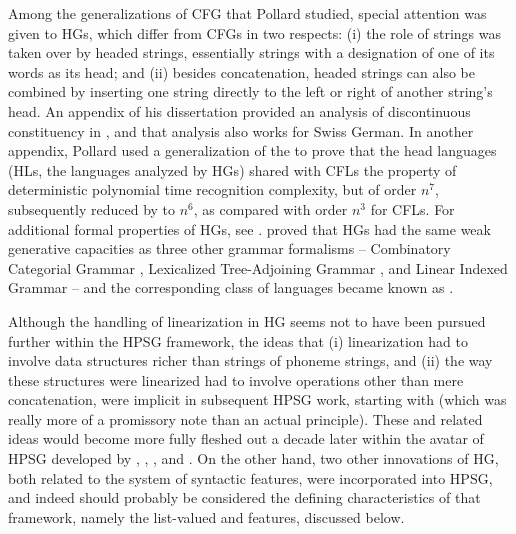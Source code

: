 \documentclass[output=paper
 	        ,biblatex
                ,babelshorthands
                ,newtxmath
                ,draftmode
                ,colorlinks, citecolor=brown
]{langscibook}
\begin{document}
Among the generalizations of CFG that Pollard studied, special attention was given to HGs, which differ from CFGs in two respects: (i) the role of strings was taken over by headed strings, essentially strings with a designation of one of its words as its head; and (ii) besides concatenation, headed strings can also be combined by inserting one string directly to the left or right of another string's head. An appendix of his dissertation \citep[Appendix~1]{Pollard84a-u} provided an analysis of discontinuous constituency in , and that analysis also works for Swiss German. In another appendix, Pollard used a generalization of the  to prove that the head languages (HLs, the languages analyzed by HGs) shared with CFLs the property of deterministic polynomial time recognition complexity, but of order $n^{7}$, subsequently reduced by \citet*{Kasamietal1989} to $n^{6}$, as compared with order $n^{3}$ for CFLs. For additional formal properties of HGs, see \citet{Roach1987}. \citet{VijayWeir1994} proved that HGs had the same weak generative capacities as three other grammar formalisms -- Combinatory Categorial Grammar \citep{Steedman87a-u,Steedman90a-u}, Lexicalized Tree-Adjoining Grammar \citep{Shabes90}, and Linear Indexed Grammar \citep{Gazdar88a-u} -- and the corresponding class of languages became known as \emph{}.

Although the handling of linearization in HG seems not to have been pursued further within the HPSG framework, the ideas that (i) linearization had to involve data structures richer than strings of phoneme strings, and (ii) the way these structures were linearized had to involve operations other than mere concatenation, were implicit in subsequent HPSG work, starting with   (which was really more of a promissory note than an actual principle).  These and related ideas would become more fully fleshed out a decade later within the  avatar of HPSG developed by \citet{Reape90a}, \citet{Reape92a}, \citet{Kathol95a,Kathol2000a}, and \citet{Mueller95c,Babel,Mueller99a,Mueller2004b}\addedthis.  On the other hand, two other innovations of HG, both related to the system of syntactic features, were incorporated into HPSG, and indeed should probably be considered the defining characteristics of that framework, namely the list-valued \subcat and \slasch features, discussed below.
\end{document}
